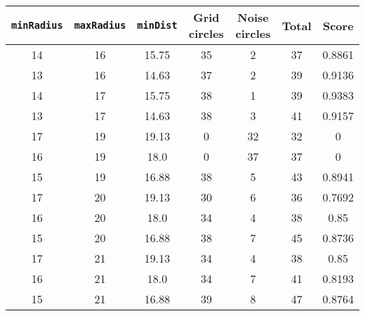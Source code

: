 \documentclass[letterpaper, 12pt]{article}
\begin{document}
\begin{longtable}{|c|c|c|c|c|c|c|}
\hline
\textbf{\texttt{minRadius}} & \textbf{\texttt{maxRadius}} & \textbf{\texttt{minDist}} & \textbf{Grid circles} & \textbf{Noise circles} & \textbf{Total} & \textbf{Score} \\
\hline
14 & 16 & 15.75 & 35 & 2 & 37 & 0.8861 \\
\hline
13 & 16 & 14.63 & 37 & 2 & 39 & 0.9136 \\
\hline
14 & 17 & 15.75 & 38 & 1 & 39 & 0.9383 \\
\hline
13 & 17 & 14.63 & 38 & 3 & 41 & 0.9157 \\
\hline
17 & 19 & 19.13 & 0 & 32 & 32 & 0 \\
\hline
16 & 19 & 18.0 & 0 & 37 & 37 & 0 \\
\hline
15 & 19 & 16.88 & 38 & 5 & 43 & 0.8941 \\
\hline
17 & 20 & 19.13 & 30 & 6 & 36 & 0.7692 \\
\hline
16 & 20 & 18.0 & 34 & 4 & 38 & 0.85 \\
\hline
15 & 20 & 16.88 & 38 & 7 & 45 & 0.8736 \\
\hline
17 & 21 & 19.13 & 34 & 4 & 38 & 0.85 \\
\hline
16 & 21 & 18.0 & 34 & 7 & 41 & 0.8193 \\
\hline
15 & 21 & 16.88 & 39 & 8 & 47 & 0.8764 \\
\hline
\end{longtable}
\end{document}
